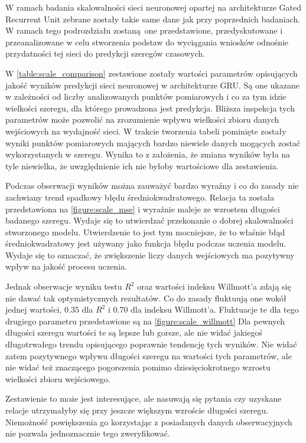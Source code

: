 \documentclass[10pt,a4paper]{article}
\begin{document}
W ramach badania skalowalności sieci neuronowej opartej na architekturze Gated Recurrent Unit zebrane zostały takie same dane jak przy poprzednich badaniach. W ramach tego podrozdziału zostaną one przedstawione, przedyskutowane i przeanalizowane w celu stworzenia podstaw do wyciągania wniosków odnośnie przydatności tej sieci do predykcji szeregów czasowych. 

W \autoref{table:scale_comparison} zestawione zostały wartości parametrów opisujących jakość wyników predykcji sieci neuronowej w architekturze GRU. Są one ukazane w zależności od liczby analizowanych punktów pomiarowych i co za tym idzie wielkości szeregu, dla którego prowadzona jest predykcja. Bliższa inspekcja tych parametrów może pozwolić na zrozumienie wpływu wielkości zbioru danych wejściowych na wydajność sieci. W trakcie tworzenia tabeli pominięte zostały wyniki punktów pomiarowych mających bardzo niewiele danych mogących zostać wykorzystanych w szeregu. Wynika to z założenia, że zmiana wyników była na tyle niewielka, że uwzględnienie ich nie byłoby wartościowe dla zestawienia. 

Podczas obserwacji wyników można zauważyć bardzo wyraźny i co do zasady nie zachwiany trend spadkowy błędu średniokwadratowego. Relacja ta została przedstawiona na \autoref{figure:scale_mse} i wyraźnie maleje ze wzrostem długości badanego szeregu. Wydaje się to utwierdzać przekonanie o dobrej skalowalności stworzonego modelu. Utwierdzenie to jest tym mocniejsze, że to właśnie błąd średniokwadratowy jest używany jako funkcja błędu podczas uczenia modelu. Wydaje się to oznaczać, że zwiększenie liczy danych wejściowych ma pozytywny wpływ na jakość procesu uczenia. 

Jednak obserwacje wyniku testu $R^2$ oraz wartości indeksu Willmott'a zdają się nie dawać tak optymistycznych rezultatów. Co do zasady fluktuują one wokół jednej wartości, 0.35 dla $R^2$ i 0.70 dla indeksu Willmott'a. Fluktuacje te dla tego drugiego parametru przedstawione są na \autoref{figure:scale_willmott} Dla pewnych długości szeregu wartości te są lepsze lub gorsze, ale nie widać jakiegoś długotrwałego trendu opisującego poprawnie tendencję tych wyników. Nie widać zatem pozytywnego wpływu długości szeregu na wartości tych parametrów, ale nie widać też znaczącego pogorszenia pomimo dziesięciokrotnego wzrostu wielkości zbioru wejściowego. 

Zestawienie to może jest interesujące, ale nasuwają się pytania czy uzyskane relacje utrzymałyby się przy jeszcze większym wzroście długości szeregu. Niemożność powiększenia go korzystając z posiadanych danych obserwacyjnych nie pozwala jednoznacznie tego zweryfikować. 
\end{document}
